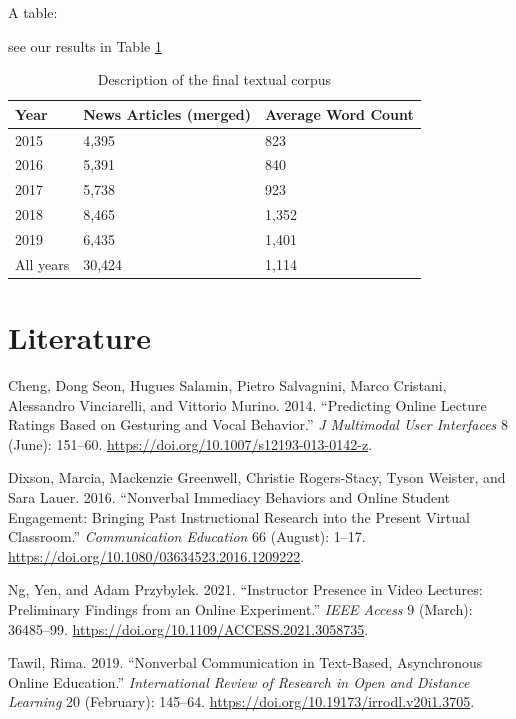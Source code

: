 \documentclass[
]{article}
\newlength{\cslhangindent}
\newlength{\cslentryspacingunit} %
\newenvironment{CSLReferences}[2] %
 {%
  \setlength{\parindent}{0pt}
  \ifodd #1
  \let\oldpar\par
  \def\par{\hangindent=\cslhangindent\oldpar}
  \fi
  \setlength{\parskip}{#2\cslentryspacingunit}
 }%
 {}
\begin{document}
A table:

see our results in Table \ref{tab:table00}

\begin{table}

\caption{\label{tab:table00}Description of the final textual corpus}
\centering
\begin{tabular}[t]{l|l|l}
\hline
Year & News Articles (merged) & Average Word Count\\
\hline
2015 & 4,395 & 823\\
\hline
2016 & 5,391 & 840\\
\hline
2017 & 5,738 & 923\\
\hline
2018 & 8,465 & 1,352\\
\hline
2019 & 6,435 & 1,401\\
\hline
All years & 30,424 & 1,114\\
\hline
\end{tabular}
\end{table}

\hypertarget{literature}{%
\section*{Literature}\label{literature}}

\hypertarget{refs}{}
\begin{CSLReferences}{1}{0}
\leavevmode{}%
Cheng, Dong Seon, Hugues Salamin, Pietro Salvagnini, Marco Cristani, Alessandro Vinciarelli, and Vittorio Murino. 2014. {``Predicting Online Lecture Ratings Based on Gesturing and Vocal Behavior.''} \emph{J Multimodal User Interfaces} 8 (June): 151--60. \url{https://doi.org/10.1007/s12193-013-0142-z}.

\leavevmode{}%
Dixson, Marcia, Mackenzie Greenwell, Christie Rogers-Stacy, Tyson Weister, and Sara Lauer. 2016. {``Nonverbal Immediacy Behaviors and Online Student Engagement: Bringing Past Instructional Research into the Present Virtual Classroom.''} \emph{Communication Education} 66 (August): 1--17. \url{https://doi.org/10.1080/03634523.2016.1209222}.

\leavevmode{}%
Ng, Yen, and Adam Przybylek. 2021. {``Instructor Presence in Video Lectures: Preliminary Findings from an Online Experiment.''} \emph{IEEE Access} 9 (March): 36485--99. \url{https://doi.org/10.1109/ACCESS.2021.3058735}.

\leavevmode{}%
Tawil, Rima. 2019. {``Nonverbal Communication in Text-Based, Asynchronous Online Education.''} \emph{International Review of Research in Open and Distance Learning} 20 (February): 145--64. \url{https://doi.org/10.19173/irrodl.v20i1.3705}.

\end{CSLReferences}
\end{document}
